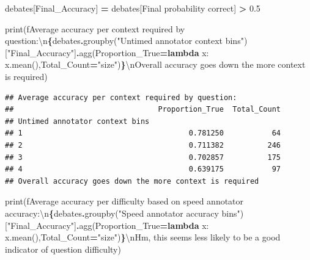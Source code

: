 \documentclass[
]{article}
\newenvironment{Shaded}{\begin{snugshade}}{\end{snugshade}}
\newcommand{\BuiltInTok}[1]{#1}
\newcommand{\CharTok}[1]{\textcolor[rgb]{0.31,0.60,0.02}{#1}}
\newcommand{\FloatTok}[1]{\textcolor[rgb]{0.00,0.00,0.81}{#1}}
\newcommand{\KeywordTok}[1]{\textcolor[rgb]{0.13,0.29,0.53}{\textbf{#1}}}
\newcommand{\NormalTok}[1]{#1}
\newcommand{\OperatorTok}[1]{\textcolor[rgb]{0.81,0.36,0.00}{\textbf{#1}}}
\newcommand{\SpecialCharTok}[1]{\textcolor[rgb]{0.81,0.36,0.00}{\textbf{#1}}}
\newcommand{\SpecialStringTok}[1]{\textcolor[rgb]{0.31,0.60,0.02}{#1}}
\newcommand{\StringTok}[1]{\textcolor[rgb]{0.31,0.60,0.02}{#1}}
\begin{document}
\begin{Shaded}
\begin{Highlighting}[]
\NormalTok{debates[}\StringTok{\textquotesingle{}Final\_Accuracy\textquotesingle{}}\NormalTok{] }\OperatorTok{=}\NormalTok{ debates[}\StringTok{\textquotesingle{}Final probability correct\textquotesingle{}}\NormalTok{] }\OperatorTok{\textgreater{}} \FloatTok{0.5}

\BuiltInTok{print}\NormalTok{(}\SpecialStringTok{f\textquotesingle{}Average accuracy per context required by question:}\CharTok{\textbackslash{}n}\SpecialCharTok{\{}\NormalTok{debates}\SpecialCharTok{.}\NormalTok{groupby(}\StringTok{"Untimed annotator context bins"}\NormalTok{)[}\StringTok{"Final\_Accuracy"}\NormalTok{]}\SpecialCharTok{.}\NormalTok{agg(Proportion\_True}\OperatorTok{=}\KeywordTok{lambda}\NormalTok{ x: x.mean(),Total\_Count}\OperatorTok{=}\StringTok{"size"}\NormalTok{)}\SpecialCharTok{\}}\CharTok{\textbackslash{}n}\SpecialStringTok{Overall accuracy goes down the more context is required\textquotesingle{}}\NormalTok{)}
\end{Highlighting}
\end{Shaded}

\begin{verbatim}
## Average accuracy per context required by question:
##                                 Proportion_True  Total_Count
## Untimed annotator context bins                              
## 1                                      0.781250           64
## 2                                      0.711382          246
## 3                                      0.702857          175
## 4                                      0.639175           97
## Overall accuracy goes down the more context is required
\end{verbatim}

\begin{Shaded}
\begin{Highlighting}[]
\BuiltInTok{print}\NormalTok{(}\SpecialStringTok{f\textquotesingle{}Average accuracy per difficulty based on speed annotator accuracy:}\CharTok{\textbackslash{}n}\SpecialCharTok{\{}\NormalTok{debates}\SpecialCharTok{.}\NormalTok{groupby(}\StringTok{"Speed annotator accuracy bins"}\NormalTok{)[}\StringTok{"Final\_Accuracy"}\NormalTok{]}\SpecialCharTok{.}\NormalTok{agg(Proportion\_True}\OperatorTok{=}\KeywordTok{lambda}\NormalTok{ x: x.mean(),Total\_Count}\OperatorTok{=}\StringTok{"size"}\NormalTok{)}\SpecialCharTok{\}}\CharTok{\textbackslash{}n}\SpecialStringTok{Hm, this seems less likely to be a good indicator of question difficulty\textquotesingle{}}\NormalTok{)}
\end{Highlighting}
\end{Shaded}
\end{document}

